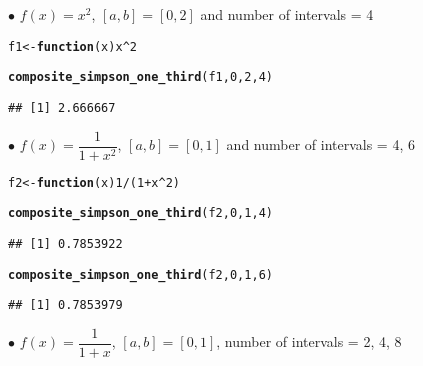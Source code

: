 \documentclass[11pt, a4paper]{article}\usepackage[]{graphicx}\usepackage[]{xcolor}
\makeatletter
\newcommand{\hlnum}[1]{\textcolor[rgb]{0.686,0.059,0.569}{#1}}%
\newcommand{\hlopt}[1]{\textcolor[rgb]{0,0,0}{#1}}%
\newcommand{\hldef}[1]{\textcolor[rgb]{0.345,0.345,0.345}{#1}}%
\newcommand{\hlkwa}[1]{\textcolor[rgb]{0.161,0.373,0.58}{\textbf{#1}}}%
\newcommand{\hlkwb}[1]{\textcolor[rgb]{0.69,0.353,0.396}{#1}}%
\newcommand{\hlkwc}[1]{\textcolor[rgb]{0.333,0.667,0.333}{#1}}%
\newcommand{\hlkwd}[1]{\textcolor[rgb]{0.737,0.353,0.396}{\textbf{#1}}}%
\newenvironment{kframe}{%
 \def\at@end@of@kframe{}%
 \ifinner\ifhmode%
  \def\at@end@of@kframe{\end{minipage}}%
  \begin{minipage}{\columnwidth}%
 \fi\fi%
 \def\FrameCommand##1{\hskip\@totalleftmargin \hskip-\fboxsep
 \colorbox{shadecolor}{##1}\hskip-\fboxsep
     \hskip-\linewidth \hskip-\@totalleftmargin \hskip\columnwidth}%
 \MakeFramed {\advance\hsize-\width
   \@totalleftmargin\z@ \linewidth\hsize
   \@setminipage}}%
 {\par\unskip\endMakeFramed%
 \at@end@of@kframe}
\newenvironment{knitrout}{}{} %
\makeatother
\begin{document}
$\bullet$ $f(x) = x^2$, $[a, b] = [0, 2]$ and number of intervals = 4

\begin{knitrout}
\color{fgcolor}\begin{kframe}
\begin{alltt}
\hldef{f1} \hlkwb{<-} \hlkwa{function}\hldef{(}\hlkwc{x}\hldef{) x}\hlopt{^}\hlnum{2}

\hlkwd{composite_simpson_one_third}\hldef{(f1,} \hlnum{0}\hldef{,} \hlnum{2}\hldef{,} \hlnum{4}\hldef{)}
\end{alltt}
\begin{verbatim}
## [1] 2.666667
\end{verbatim}
\end{kframe}
\end{knitrout}

$\bullet$ $f(x) = \dfrac{1}{1+x^2}$, $[a, b] = [0, 1]$ and number of intervals = 4, 6

\begin{knitrout}
\color{fgcolor}\begin{kframe}
\begin{alltt}
\hldef{f2} \hlkwb{<-} \hlkwa{function}\hldef{(}\hlkwc{x}\hldef{)} \hlnum{1} \hlopt{/} \hldef{(}\hlnum{1} \hlopt{+} \hldef{x}\hlopt{^}\hlnum{2}\hldef{)}

\hlkwd{composite_simpson_one_third}\hldef{(f2,} \hlnum{0}\hldef{,} \hlnum{1}\hldef{,} \hlnum{4}\hldef{)}
\end{alltt}
\begin{verbatim}
## [1] 0.7853922
\end{verbatim}
\end{kframe}
\end{knitrout}

\begin{knitrout}
\color{fgcolor}\begin{kframe}
\begin{alltt}
\hlkwd{composite_simpson_one_third}\hldef{(f2,} \hlnum{0}\hldef{,} \hlnum{1}\hldef{,} \hlnum{6}\hldef{)}
\end{alltt}
\begin{verbatim}
## [1] 0.7853979
\end{verbatim}
\end{kframe}
\end{knitrout}

$\bullet$ $f(x) = \dfrac{1}{1+x}$, $[a, b] = [0, 1]$, number of intervals = 2, 4, 8
\end{document}
